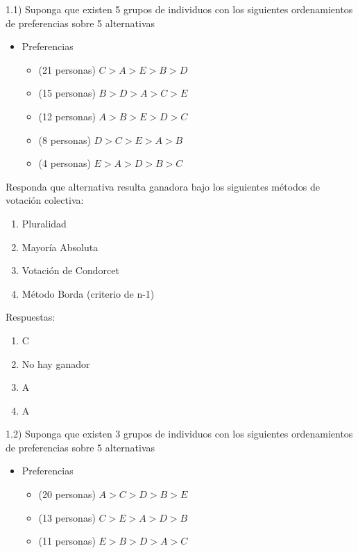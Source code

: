 \documentclass[
  letterpaper,
  DIV=11,
  numbers=noendperiod]{scrartcl}
\providecommand{\tightlist}{%
  \setlength{\itemsep}{0pt}\setlength{\parskip}{0pt}}
\begin{document}
1.1) Suponga que existen 5 grupos de individuos con los siguientes
ordenamientos de preferencias sobre 5 alternativas

\begin{itemize}
\tightlist
\item
  Preferencias

  \begin{itemize}
  \tightlist
  \item
    (21 personas) \(C>A>E>B>D\)
  \item
    (15 personas) \(B>D>A>C>E\)
  \item
    (12 personas) \(A>B>E>D>C\)
  \item
    (8 personas) \(D>C>E>A>B\)
  \item
    (4 personas) \(E>A>D>B>C\)
  \end{itemize}
\end{itemize}

Responda que alternativa resulta ganadora bajo los siguientes métodos de
votación colectiva:

\begin{enumerate}
\def\labelenumi{\alph{enumi})}
\tightlist
\item
  Pluralidad
\item
  Mayoría Absoluta
\item
  Votación de Condorcet
\item
  Método Borda (criterio de n-1)
\end{enumerate}

Respuestas:

\begin{enumerate}
\def\labelenumi{\alph{enumi})}
\tightlist
\item
  C
\item
  No hay ganador
\item
  A
\item
  A
\end{enumerate}

1.2) Suponga que existen 3 grupos de individuos con los siguientes
ordenamientos de preferencias sobre 5 alternativas

\begin{itemize}
\tightlist
\item
  Preferencias

  \begin{itemize}
  \tightlist
  \item
    (20 personas) \(A>C>D>B>E\)
  \item
    (13 personas) \(C>E>A>D>B\)
  \item
    (11 personas) \(E>B>D>A>C\)
  \end{itemize}
\end{itemize}
\end{document}
